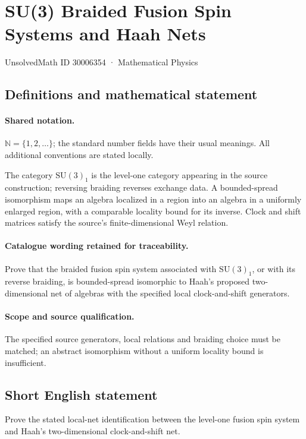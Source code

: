 \documentclass[11pt]{article}
\begin{document}
\setcounter{section}{30006353}
\section{SU(3) Braided Fusion Spin Systems and Haah Nets}\label{30006354}
{\small UnsolvedMath ID 30006354 · Mathematical Physics}
\subsection{Definitions and mathematical statement}

\paragraph{Shared notation.}$\mathbb N=\{1,2,\ldots\}$; the standard number fields have their usual meanings. All additional conventions are stated locally.


The category $\mathrm{SU}(3)_1$ is the level-one category appearing in the source construction; reversing braiding reverses exchange data. A bounded-spread isomorphism maps an algebra localized in a region into an algebra in a uniformly enlarged region, with a comparable locality bound for its inverse. Clock and shift matrices satisfy the source's finite-dimensional Weyl relation.

\paragraph{Catalogue wording retained for traceability.}
Prove that the braided fusion spin system associated with $\mathrm{SU}(3)_1$, or with its reverse braiding, is bounded-spread isomorphic to Haah's proposed two-dimensional net of algebras with the specified local clock-and-shift generators.

\paragraph{Scope and source qualification.}The specified source generators, local relations and braiding choice must be matched; an abstract isomorphism without a uniform locality bound is insufficient.
\subsection{Short English statement}
Prove the stated local-net identification between the level-one fusion spin system and Haah's two-dimensional clock-and-shift net.
\end{document}
